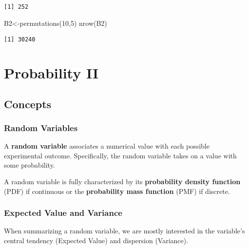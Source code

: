 \documentclass[
  letterpaper,
  DIV=11,
  numbers=noendperiod]{scrreprt}
\newenvironment{Shaded}{\begin{snugshade}}{\end{snugshade}}
\newcommand{\DecValTok}[1]{\textcolor[rgb]{0.68,0.00,0.00}{#1}}
\newcommand{\FunctionTok}[1]{\textcolor[rgb]{0.28,0.35,0.67}{#1}}
\newcommand{\NormalTok}[1]{\textcolor[rgb]{0.00,0.23,0.31}{#1}}
\newcommand{\OtherTok}[1]{\textcolor[rgb]{0.00,0.23,0.31}{#1}}
\begin{document}
\begin{verbatim}
[1] 252
\end{verbatim}

\begin{Shaded}
\begin{Highlighting}[numbers=left,,]
\NormalTok{B2}\OtherTok{\textless{}{-}}\FunctionTok{permutations}\NormalTok{(}\DecValTok{10}\NormalTok{,}\DecValTok{5}\NormalTok{)}
\FunctionTok{nrow}\NormalTok{(B2)}
\end{Highlighting}
\end{Shaded}

\begin{verbatim}
[1] 30240
\end{verbatim}

\hypertarget{probability-ii}{%
\chapter{Probability II}\label{probability-ii}}

\hypertarget{concepts-8}{%
\section{Concepts}\label{concepts-8}}

\hypertarget{random-variables}{%
\subsection*{Random Variables}\label{random-variables}}

A \textbf{random variable} associates a numerical value with each
possible experimental outcome. Specifically, the random variable takes
on a value with some probability.

A random variable is fully characterized by its \textbf{probability
density function} (PDF) if continuous or the \textbf{probability mass
function} (PMF) if discrete.

\hypertarget{expected-value-and-variance}{%
\subsection*{Expected Value and
Variance}\label{expected-value-and-variance}}

When summarizing a random variable, we are mostly interested in the
variable's central tendency (Expected Value) and dispersion (Variance).
\end{document}
